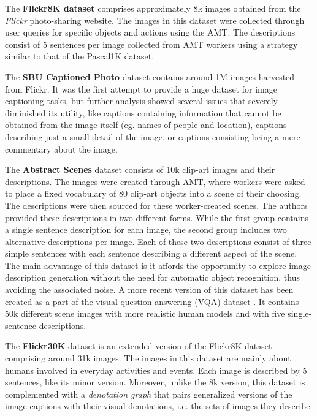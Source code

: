 The \textbf{Flickr8K dataset} \citep{Rashtchian2010} comprises approximately 8k images obtained from the \textit{Flickr} photo-sharing website. The images in this dataset were collected through user queries for specific objects and actions using the AMT. The descriptions consist of 5 sentences per image collected from AMT workers using a strategy similar to that of the Pascal1K dataset. 

The \textbf{SBU Captioned Photo} dataset \citep{Ordonez2011} contains around 1M images harvested from Flickr. It was the first attempt to provide a huge dataset for image captioning tasks, but further analysis showed several issues that severely diminished its utility, like captions containing information that cannot be obtained from the image itself (eg. names of people and location), captions describing just a small detail of the image, or captions consisting being a mere commentary about the image.

The \textbf{Abstract Scenes} dataset \citep{Zitnick2013} consists of 10k clip-art images and their descriptions. The images were created through AMT, where workers were asked to place a fixed vocabulary of 80 clip-art objects into a scene of their choosing. The descriptions were then sourced for these worker-created scenes. The authors provided these descriptions in two different forms. While the first group contains a single sentence description for each image, the second group includes two alternative descriptions per image. Each of these two descriptions consist of three simple sentences with each sentence describing a different aspect of the scene. The main advantage of this dataset is it affords the opportunity to explore image description generation without the need for automatic object recognition, thus avoiding the associated noise. A more recent version of this dataset has been created as a part of the visual question-answering (VQA) dataset \citep{Antol2015}. It contains 50k different scene images with more realistic human models and with five single-sentence descriptions. 

The \textbf{Flickr30K} dataset \citep{Young2014} is an extended version of the Flickr8K dataset comprising around 31k images. The images in this dataset are mainly about humans involved in everyday activities and events. Each image is described by 5 sentences, like its minor version. Moreover, unlike the 8k version, this dataset is complemented with a \textit{denotation graph} that pairs generalized versions of the image captions with their visual denotations, i.e. the sets of images they describe.

